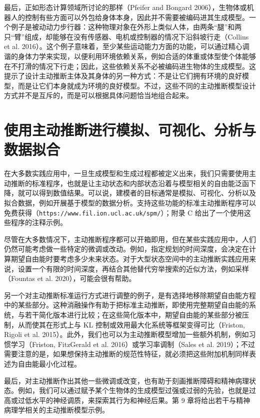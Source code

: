最后，正如形态计算领域所讨论的那样（Pfeifer and Bongard 2006），生物体或机器人的控制有些方面可以外包给身体本身，因此并不需要被编码进其生成模型。一个例子是被动动力步行器：这种物理对象在外形上类似人体，由两条“腿”和两只“臂”组成，却能够在没有传感器、电机或控制器的情况下沿斜坡行走（Collins et al. 2016）。这个例子意味着，至少某些运动能力方面的功能，可以通过精心调谐的身体力学来实现，以便利用环境依赖关系，例如合适的体重或体型使个体能够在不打滑的情况下行走；因此，这些依赖关系不必被编码进生物体的生成模型。这提示了设计主动推断主体及其身体的另一种方式：不是让它们拥有环境的良好模型，而是让它们本身就成为环境的良好模型。不过，这些不同的主动推断模型设计方式并不是互斥的，而是可以根据具体问题恰当地组合起来。

\section{使用主动推断进行模拟、可视化、分析与数据拟合}

在大多数实践应用中，一旦生成模型和生成过程都被定义出来，我们只需要使用主动推断的标准程序，也就是让主动状态和内部状态沿着与模型相关的自由能泛函下降，就可以得到数值结果。可以说，建模者的目标通常是模拟、可视化、分析以及拟合数据，例如开展基于模型的数据分析。支持这些功能的标准主动推断程序可以免费获得（\texttt{https://www.fil.ion.ucl.ac.uk/spm/}）；附录 C 给出了一个使用这些程序的注释示例。

尽管在大多数情况下，主动推断程序都可以开箱即用，但在某些实践应用中，人们仍然可能考虑做一些特定的微调或改动。例如，指定规划的时间深度，会决定在计算期望自由能时要考虑多少未来状态。对于大型状态空间中的主动推断实践应用来说，设置一个有限的时间深度，再结合其他替代穷举搜索的近似方法，例如采样（Fountas et al. 2020），可能会很有帮助。

另一个对主动推断标准运行方式进行调整的例子，是有选择地移除期望自由能方程中的某些部分。这种消融操作有助于把标准主动推断，即使用完整期望自由能的系统，与若干简化版本进行比较；在这些简化版本中，期望自由能的某些部分被压制，从而使其在形式上与 KL 控制或效用最大化系统等框架变得可比（Friston, Rigoli et al. 2015）。此外，我们也可以为主动推断模型增加一些额外机制，例如习惯学习（Friston, FitzGerald et al. 2016）或学习率调制（Sales et al. 2019）；不过需要注意的是，如果想保持主动推断的规范性特征，就必须把这些附加机制同样表述为自由能最小化过程。

最后，对主动推断作出其他一些微调或改变，也有助于刻画推断障碍和精神病理状态。例如，我们可以通过赋予某个生物体的生成模型过强或过弱的先验，也就是过高或过低水平的神经调质，来探索其行为和神经后果。第 9 章将给出若干与精神病理学相关的主动推断模型示例。

